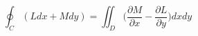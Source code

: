     \begin{center}
        \begin{equation*}
            \oint_C (Ldx + Mdy) = \iint_D \bigg(\frac{\partial{M}}{\partial{x}} - \frac{\partial{L}}{\partial{y}}\bigg)dxdy
        \end{equation*}
    \end{center}
